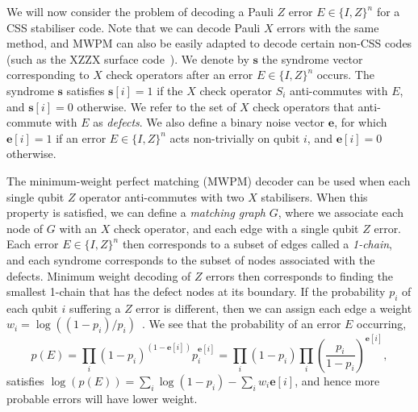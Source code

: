 \documentclass{article}
\begin{document}
We will now consider the problem of decoding a Pauli $Z$ error $E\in\{I,Z\}^n$ for a CSS stabiliser code.
Note that we can decode Pauli $X$ errors with the same method, and MWPM can also be easily adapted to decode certain non-CSS codes (such as the XZZX surface code~\cite{bonilla2020xzzx}).
We denote by $\mathbf{s}$ the syndrome vector corresponding to $X$ check operators after an error $E\in\{I,Z\}^n$ occurs.
The syndrome $\mathbf{s}$ satisfies $\mathbf{s}[i]=1$ if the $X$ check operator $S_i$ anti-commutes with $E$, and $\mathbf{s}[i]=0$ otherwise.
We refer to the set of $X$ check operators that anti-commute with $E$ as \textit{defects}.
We also define a binary noise vector $\mathbf{e}$, for which $\mathbf{e}[i]=1$ if an error $E\in\{I,Z\}^n$ acts non-trivially on qubit $i$, and $\mathbf{e}[i]=0$ otherwise.

The minimum-weight perfect matching (MWPM) decoder can be used when each single qubit $Z$ operator anti-commutes with two $X$ stabilisers.
When this property is satisfied, we can define a \textit{matching graph} $G$, where we associate each node of $G$ with an $X$ check operator, and each edge with a single qubit $Z$ error.
Each error $E\in\{I,Z\}^n$ then corresponds to a subset of edges called a \textit{1-chain}, and each syndrome corresponds to the subset of nodes associated with the defects.
Minimum weight decoding of $Z$ errors then corresponds to finding the smallest 1-chain that has the defect nodes at its boundary.
If the probability $p_i$ of each qubit $i$ suffering a $Z$ error is different, then we can assign each edge a weight $w_i=\log((1-p_i)/p_i)$~\cite{dennis2002topological}.
We see that the probability of an error $E$ occurring,
\begin{equation}
p(E)=\prod_i (1-p_i)^{(1-\mathbf{e}[i])} p_i^{\mathbf{e}[i]}=\prod_i (1-p_i)\prod_i \left(\frac{p_i}{1-p_i}\right)^{\mathbf{e}[i]},
\end{equation}
satisfies $\log(p(E))=\sum_i \log(1-p_i)-\sum_i w_i\mathbf{e}[i]$, and hence more probable errors will have lower weight.
\end{document}

